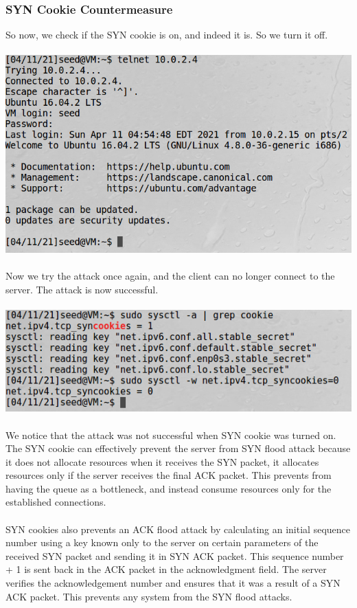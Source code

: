 \documentclass[a4paper]{article}
\begin{document}
\subsubsection{SYN Cookie Countermeasure}
So now, we check if the SYN cookie is on, and indeed it is. So we turn it off.\\\\
\includegraphics[scale=0.7]{1/8.png}\\\\
Now we try the attack once again, and the client can no longer connect to the server. The attack is now successful.\\\\
\includegraphics[scale=0.7]{1/9.png}\\\\
We notice that the attack was not successful when SYN cookie was turned on. The SYN cookie can effectively prevent the server from SYN flood attack because it does not allocate resources when it receives the SYN packet, it allocates resources only if the server receives the final ACK packet. This prevents from having the queue as a bottleneck, and instead consume resources only for the established connections.\\\\
SYN cookies also prevents an ACK flood attack by calculating an initial sequence number using a key known only to the server on certain parameters of the received SYN packet and sending it in SYN ACK packet. This sequence number + 1 is sent back in the ACK packet in the acknowledgment field. The server verifies the acknowledgement number and ensures that it was a result of a SYN ACK packet. This prevents any system from the SYN flood attacks.\\\\
\end{document}

